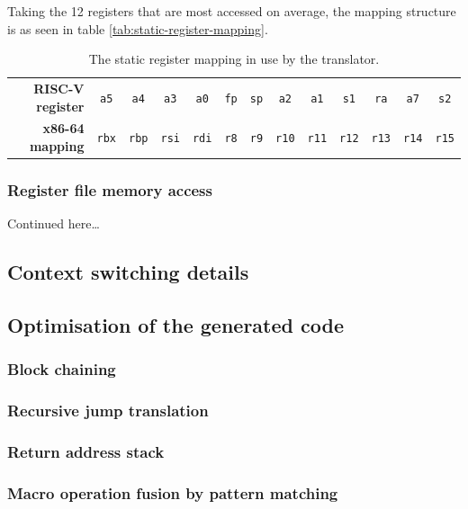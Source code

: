 Taking the 12 registers that are most accessed on average, the mapping structure is as seen in table \vref{tab:static-register-mapping}.

\begin{table}
	\centering
	\begin{tabular}{rcccccccccccc}
		\toprule
		\textbf{RISC-V register} & \texttt{a5} & \texttt{a4} & \texttt{a3} & \texttt{a0} & \texttt{fp} & \texttt{sp} & \texttt{a2} & \texttt{a1} & \texttt{s1} & \texttt{ra} & \texttt{a7} & \texttt{s2}\\
		\textbf{x86-64 mapping} & \texttt{rbx} & \texttt{rbp} & \texttt{rsi} & \texttt{rdi} & \texttt{r8} & \texttt{r9} & \texttt{r10} & \texttt{r11} & \texttt{r12} & \texttt{r13} & \texttt{r14} & \texttt{r15}\\
		\bottomrule
	\end{tabular}
	\caption{The static register mapping in use by the translator.}
	\label{tab:static-register-mapping}
\end{table}

\subsubsection{Register file memory access}
Continued here\ldots


\subsection{Context switching details}

\subsection{Optimisation of the generated code}
\label{sec:optimise}
\subsubsection{Block chaining}
\subsubsection{Recursive jump translation}
\subsubsection{Return address stack}
\subsubsection{Macro operation fusion by pattern matching}

